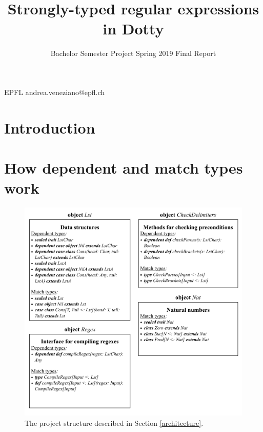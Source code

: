 \documentclass[nocopyrightspace,11pt,preprint]{sigplanconf}
\begin{document}


\title{Strongly-typed regular expressions in Dotty}
\subtitle{Bachelor Semester Project Spring 2019 Final Report}

           {EPFL}
           {andrea.veneziano@epfl.ch}

\maketitle

\begin{abstract}
   
\end{abstract}

\section{Introduction}


\section{How dependent and match types work}


\onecolumn

\begin{figure}[h]
\begin{center}\includegraphics[scale=0.8]{images/structure.png}
\end{center}
\caption{The project structure described in Section \ref{architecture}.}
\label{structure.png}
\end{figure}
\end{document}
